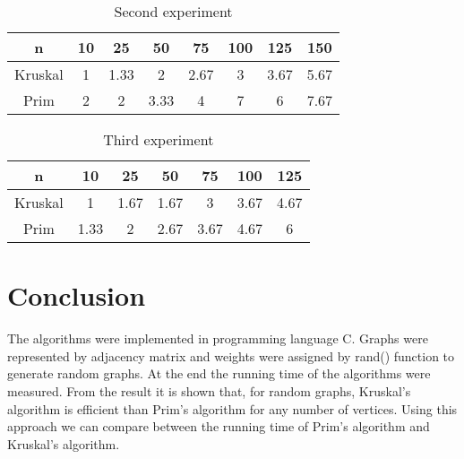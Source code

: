 \documentclass[conference,column]{IEEEtran}
\begin{document}
\begin{table}[!h]
\renewcommand{\arraystretch}{1.3}
\caption{Second experiment}
\label{table2}
\centering
\begin{tabular}{|c|c|c|c|c|c|c|c|}
  \hline
  n & 10 & 25 & 50 & 75 & 100 & 125 & 150 \\
  \hline
  Kruskal & 1 & 1.33 & 2 & 2.67 & 3 & 3.67 & 5.67 \\
  \hline
  Prim & 2 & 2 & 3.33 & 4 & 7 & 6 & 7.67 \\
  \hline
\end{tabular}
\end{table}



\begin{table}[!h]
\renewcommand{\arraystretch}{1.3}
\caption{Third experiment}
\label{table3}
\centering
\begin{tabular}{|c|c|c|c|c|c|c|}
  \hline
  n & 10 & 25 & 50 & 75 & 100 & 125 \\
  \hline
  Kruskal & 1 & 1.67 & 1.67 & 3 & 3.67 & 4.67 \\
  \hline
  Prim & 1.33 & 2 & 2.67 & 3.67 & 4.67 & 6 \\
  \hline
\end{tabular}
\end{table}



\section{Conclusion}
The algorithms were implemented in programming language C. Graphs were represented by adjacency matrix and weights were assigned by rand() function to generate random graphs. At the end the running time of the algorithms were measured. From the result it is shown that, for random graphs, Kruskal's algorithm is efficient than Prim's algorithm for any number of vertices. Using this approach we can compare between the running time of Prim's algorithm and Kruskal's algorithm.
\end{document}
